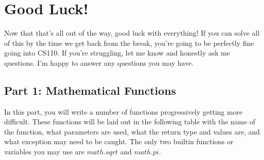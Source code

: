 \documentclass[12pt]{report}
\begin{document}
\section*{Good Luck!}
Now that that's all out of the way, good luck with everything! 
If you can solve all of this by the time we get back from the break, you're going to be perfectly fine going into CS110. 
If you're struggling, let me know and honestly ask me questions. 
I'm happy to answer any questions you may have.

\newpage

\subsection*{Part 1: Mathematical Functions}

In this part, you will write a number of functions progressively getting more difficult.
These functions will be laid out in the following table with the name of the function, what parameters are used, what the return type and values are, and what exception may need to be caught. 
The only two builtin functions or variables you may use are ${math.sqrt}$ and ${math.pi}$. 

${}$
\end{document}

